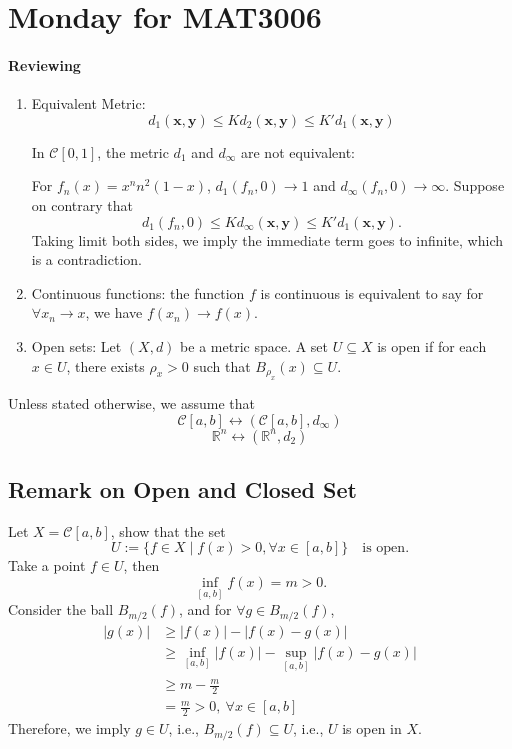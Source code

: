 \section{Monday for MAT3006}
\paragraph{Reviewing}
\begin{enumerate}
\item
Equivalent Metric:
\[
d_1(\bm x,\bm y)\le Kd_2(\bm x,\bm y)\le K'd_1(\bm x,\bm y)
\]

In $\mathcal{C}[0,1]$, the metric $d_1$ and $d_\infty$ are not equivalent: 

For $f_n(x)=x^nn^2(1-x)$, $d_1(f_n,0)\to1$ and $d_\infty(f_n,0)\to\infty$. Suppose on contrary that 
\[
d_1(f_n,0)\le Kd_\infty(\bm x,\bm y)\le K'd_1(\bm x,\bm y).
\]
Taking limit both sides, we imply the immediate term goes to infinite, which is a contradiction.
\item
Continuous functions: the function $f$ is continuous is equivalent to say for $\forall x_n\to x$, we have $f(x_n)\to f(x)$.
\item
Open sets: Let $(X,d)$ be a metric space. A set $U\subseteq X$ is open if for each $x\in U$, there exists $\rho_x>0$ such that $B_{\rho_x}(x)\subseteq U$.
\end{enumerate}

\begin{remark}
Unless stated otherwise, we assume that 
\[
\mathcal{C}[a,b]\longleftrightarrow
(\mathcal{C}[a,b],d_\infty)
\]
\[
\mathbb{R}^n\longleftrightarrow
(\mathbb{R}^n,d_2)
\]
\end{remark}
\subsection{Remark on Open and Closed Set}

\begin{example}\label{Exp:2:6}
Let $X=\mathcal{C}[a,b]$, show that the set 
\[
U:=\{f\in X\mid f(x)>0,\forall x\in[a,b]\}\quad\text{is open}.
\]
Take a point $f\in U$, then
\[
\inf_{[a,b]}f(x)=m>0.
\]
Consider the ball $B_{m/2}(f)$, and for $\forall g\in B_{m/2}(f)$,
\begin{align*}
|g(x)|&\ge |f(x)|-|f(x)-g(x)|\\
&\ge\inf_{[a,b]}|f(x)|-\sup_{[a,b]}|f(x)-g(x)|\\
&\ge m-\frac{m}{2}\\&=\frac{m}{2}>0,\ \forall x\in[a,b]
\end{align*}
Therefore, we imply $g\in U$, i.e., $B_{m/2}(f)\subseteq U$, i.e., $U$ is open in $X$.
\end{example}

